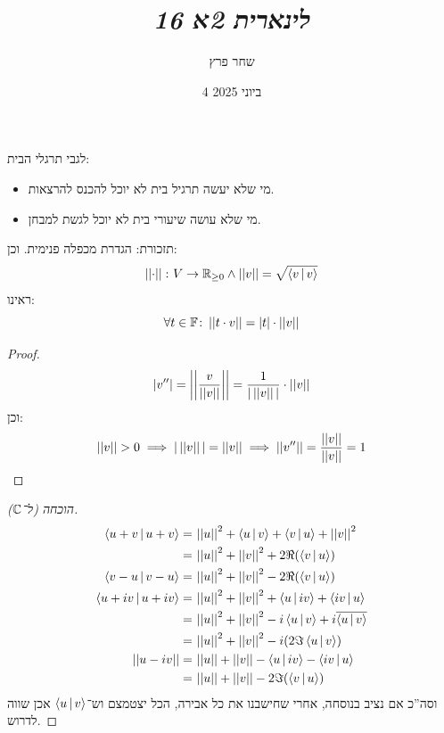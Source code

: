 \documentclass[]{../../../../tex/classes/styledArticle}
\author{שחר פרץ}
\title{\textit{לינארית 2א 16}}
\date{4 ביוני 2025}
\begin{document}
    \maketitle
    לגבי תרגלי הבית: 
    \begin{itemize}
        \item מי שלא יעשה תרגיל בית לא יוכל להכנס להרצאות. 
        \item מי שלא עושה שיעורי בית לא יוכל לגשת למבחן. 
    \end{itemize}
    
    תזכורת: הגדרת מכפלה פנימית. 
    וכן: 
    \[ \snorm \co V \to \R_{\ge 0} \land \norm{v} = \sqrt{\mut{v}{v}} \]
    ראינו: 
    \[ \forall t \in \F \co \norm{t \cdot v} = |t| \cdot \norm{v} \]
    \begin{proof}
        \[ |v''| = \norm{\frac{v}{\norm{v}}} = \frac{1}{|\norm{v}|} \cdot \norm{v} \]
        וכן: 
        \[ \norm{v} > 0 \implies |\norm{v}| = \norm{v} \implies \norm{v''} = \frac{\norm{v}}{\norm{v}} = 1 \]
    \end{proof}
   \begin{proof}[הוכחה (ל־$\C$)]
        \begin{align*}
            \mut{u + v}{u + v} =\,& \norm{u}^2 + \mut{u}{v} + \mut{v}{u} + \norm{v}^2 \\
            =\,& \norm{u}^2 + \norm{v}^2 + 2\Re(\mut{v}{u}) \\
            \mut{v - u}{v - u} = \, & \norm{u}^2 + \norm{v}^2 - 2\Re(\mut{v}{u}) \\
            \mut{u + iv}{u + iv} =\,& \norm{u}^2 + \norm{v}^2 + \mut{u}{iv} + \mut{iv}{u}  \\
            =\,& \norm{u}^2 + \norm{v}^2 - i\mut{u}{v} + i\ol{\mut{u}{v}} \\
            =\,& \norm{u}^2 + \norm{v}^2 - i(2 \Im\mut{u}{v}) \\
            \norm{u - iv} =\,& \norm{u} + \norm{v} - \mut{u}{iv} - \mut{iv}{u} \\
            =\,& \norm{u} + \norm{v} - 2\Im(\mut{v}{u})
        \end{align*}
        וסה''כ אם נציב בנוסחה, אחרי שחישבנו את כל אבירה, הכל יצטמצם וש־$\mut{u}{v}$ אכן שווה לדרוש. 
    \end{proof}
    
\end{document}
